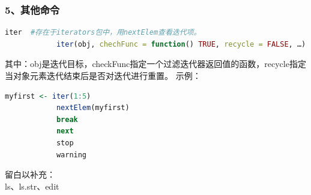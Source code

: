        \subsubsection{5、其他命令}
                \begin{lstlisting}[language=R]
            iter  #存在于iterators包中，用nextElem查看迭代项。
            iter(obj, chechFunc = function() TRUE, recycle = FALSE, …)
                \end{lstlisting}
            其中：obj是迭代目标，checkFunc指定一个过滤迭代器返回值的函数，recycle指定当对象元素迭代结束后是否对迭代进行重置。
            示例：
                \begin{lstlisting}[language=R]
            myfirst <- iter(1:5)
            nextElem(myfirst)
            break
            next
            stop
            warning
                \end{lstlisting}
            留白以补充：\\
            ls、ls.str、edit


% 


